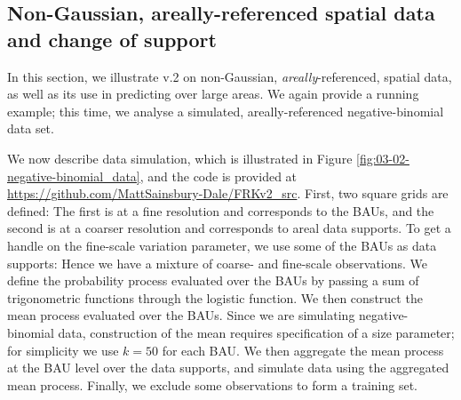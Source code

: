 \documentclass[nojss]{jss}
\newcommand{\class}[1]{`\code{#1}'}
\begin{document}
\subsection{Non-Gaussian, areally-referenced spatial data and change of support}\label{sec:03-03:negative-binomial}



In this section, we illustrate  v.2 on non-Gaussian, \textit{areally}-referenced, spatial data, as well as its use in predicting over large areas. 
We again provide a running example; this time, we analyse a simulated, areally-referenced negative-binomial data set.

 
We now describe data simulation, which is illustrated in Figure \ref{fig:03-02-negative-binomial_data}, and the code is provided at \url{https://github.com/MattSainsbury-Dale/FRKv2_src}. 
First, two square grids are defined: The first is at a fine resolution and corresponds to the BAUs, and the second is at a coarser resolution and corresponds to areal data supports. 
 To get a handle on the fine-scale variation parameter, we use some of the BAUs as data supports: Hence we have a mixture of coarse- and fine-scale observations. 
We define the probability process evaluated over the BAUs by passing a sum of trigonometric functions through the logistic function. 
We then construct the mean process evaluated over the BAUs. Since we are simulating negative-binomial data, construction of the mean requires specification of a size parameter; for simplicity we use $k = 50$ for each BAU.
We then aggregate the mean process at the BAU level over the data supports, and simulate data using the aggregated mean process. 
Finally, we exclude some observations to form a training set. 
\end{document}
